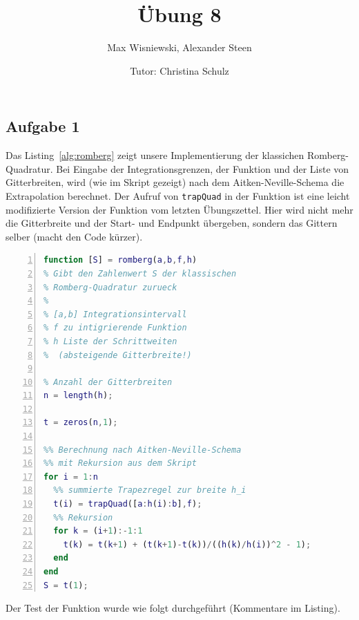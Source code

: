\documentclass[11pt,a4paper,ngerman]{article}
\date{Tutor: Christina Schulz}
\title{Übung 8}
\author{Max Wisniewski, Alexander Steen}
\begin{document}

\renewcommand{\figurename}{Figure}

\maketitle
\thispagestyle{fancy}

\subsection*{Aufgabe 1}
Das Listing~\ref{alg:romberg} zeigt unsere Implementierung der klassichen Romberg-Quadratur.
Bei Eingabe der Integrationsgrenzen, der Funktion und der Liste von Gitterbreiten, wird (wie 
im Skript gezeigt) nach dem Aitken-Neville-Schema die Extrapolation berechnet.
Der Aufruf von \texttt{trapQuad} in der Funktion ist eine leicht modifizierte Version der Funktion vom letzten Übungszettel. Hier wird nicht mehr die Gitterbreite und der Start- und Endpunkt übergeben, sondern das Gittern selber (macht den Code kürzer).

\begin{lstlisting}[language=matlab, numbers=left, caption=Klassische Romberg-Quadratur, label=alg:romberg]
function [S] = romberg(a,b,f,h)
% Gibt den Zahlenwert S der klassischen
% Romberg-Quadratur zurueck
%
% [a,b] Integrationsintervall
% f zu intigrierende Funktion
% h Liste der Schrittweiten
%  (absteigende Gitterbreite!)

% Anzahl der Gitterbreiten
n = length(h);

t = zeros(n,1);

%% Berechnung nach Aitken-Neville-Schema
%% mit Rekursion aus dem Skript
for i = 1:n
  %% summierte Trapezregel zur breite h_i
  t(i) = trapQuad([a:h(i):b],f);
  %% Rekursion
  for k = (i+1):-1:1
    t(k) = t(k+1) + (t(k+1)-t(k))/((h(k)/h(i))^2 - 1);
  end
end
S = t(1);
\end{lstlisting}

Der Test der Funktion wurde wie folgt durchgeführt (Kommentare im Listing).
\end{document}
